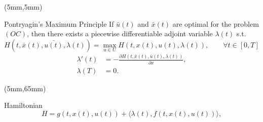 \begin{frame}[plain]
    \begin{textblock*}{120mm}(5mm,5mm)
        \begin{graybox}{Pontryagin’s Maximum Principle}
            If $\bar{u}(t)$ and $\bar{x}(t)$ are optimal for the problem 
            $(OC)$, then there exists a piecewise differentiable adjoint 
            variable $\lambda(t)$ s.t.
            \begin{equation*}
                H(t,\bar{x}(t), \bar{u(t)}, \lambda(t))
                =
                \max_{u \in U} H(t, x(t), u(t), \lambda(t)),
                \qquad \forall t \in [0, T]
            \end{equation*}
%
            \begin{align*}
                    \lambda'(t) &= -\frac{\partial 
                    H(t,\bar{x}(t),\bar{u}(t),\lambda(t))}{\partial x},\\
                \lambda(T) &= 0.
            \end{align*}
        \end{graybox}
    \end{textblock*}
    \begin{textblock*}{75mm}(5mm,65mm)
        \begin{yellowbox}{Hamiltonian}
            \begin{equation*}
                H=g(t,x(t),u(t))+\langle \lambda(t),f(t,x(t),u(t))\rangle,
            \end{equation*}
        \end{yellowbox}
    \end{textblock*}
\end{frame}
%
